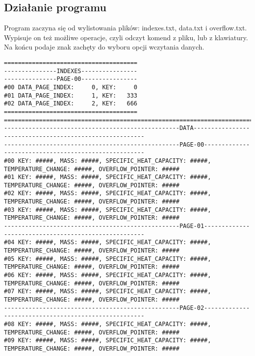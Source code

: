 \documentclass{article}
\begin{document}
    \subsection*{Działanie programu}

    Program zaczyna się od wylistowania plików: indexes.txt, data.txt i overflow.txt. Wypisuje on też możliwe operacje, czyli odczyt komend z pliku, lub z klawiatury.
    Na końcu podaje znak zachęty do wyboru opcji wczytania danych.

    \begin{lstlisting}[basicstyle=\ttfamily\fontsize{6}{8}\selectfont, breaklines=true]
======================================
---------------INDEXES----------------
---------------PAGE-00----------------
#00 DATA_PAGE_INDEX:     0, KEY:     0
#01 DATA_PAGE_INDEX:     1, KEY:   333
#02 DATA_PAGE_INDEX:     2, KEY:   666
======================================
==============================================================================================================
--------------------------------------------------DATA--------------------------------------------------------
--------------------------------------------------PAGE-00-----------------------------------------------------
#00 KEY: #####, MASS: #####, SPECIFIC_HEAT_CAPACITY: #####, TEMPERATURE_CHANGE: #####, OVERFLOW_POINTER: #####
#01 KEY: #####, MASS: #####, SPECIFIC_HEAT_CAPACITY: #####, TEMPERATURE_CHANGE: #####, OVERFLOW_POINTER: #####
#02 KEY: #####, MASS: #####, SPECIFIC_HEAT_CAPACITY: #####, TEMPERATURE_CHANGE: #####, OVERFLOW_POINTER: #####
#03 KEY: #####, MASS: #####, SPECIFIC_HEAT_CAPACITY: #####, TEMPERATURE_CHANGE: #####, OVERFLOW_POINTER: #####
--------------------------------------------------PAGE-01-----------------------------------------------------
#04 KEY: #####, MASS: #####, SPECIFIC_HEAT_CAPACITY: #####, TEMPERATURE_CHANGE: #####, OVERFLOW_POINTER: #####
#05 KEY: #####, MASS: #####, SPECIFIC_HEAT_CAPACITY: #####, TEMPERATURE_CHANGE: #####, OVERFLOW_POINTER: #####
#06 KEY: #####, MASS: #####, SPECIFIC_HEAT_CAPACITY: #####, TEMPERATURE_CHANGE: #####, OVERFLOW_POINTER: #####
#07 KEY: #####, MASS: #####, SPECIFIC_HEAT_CAPACITY: #####, TEMPERATURE_CHANGE: #####, OVERFLOW_POINTER: #####
--------------------------------------------------PAGE-02-----------------------------------------------------
#08 KEY: #####, MASS: #####, SPECIFIC_HEAT_CAPACITY: #####, TEMPERATURE_CHANGE: #####, OVERFLOW_POINTER: #####
#09 KEY: #####, MASS: #####, SPECIFIC_HEAT_CAPACITY: #####, TEMPERATURE_CHANGE: #####, OVERFLOW_POINTER: #####

\end{lstlisting}
\end{document}
